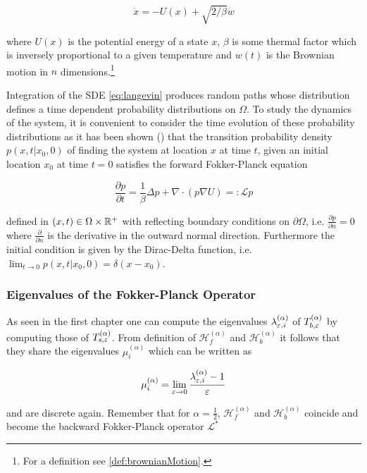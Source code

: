 \begin{equation}\label{eq:langevin}
\dot{x}=-U(x)+\sqrt{2/\beta}\dot{w}
\end{equation}

where $U(x)$ is the potential energy of a state $x$, $\beta$ is some thermal factor which is inversely proportional to a given temperature and $w(t)$ is the Brownian motion in $n$ dimensions.\footnote{For a definition see \ref{def:brownianMotion}.}

Integration of the SDE \eqref{eq:langevin} produces random paths whose distribution defines a time dependent probability distributions on $\Omega$. To study the dynamics of the system, it is convenient to consider the time evolution of these probability distributions as it has been shown (\cite{Garcia2007}) that the transition probability density $p(x, t | x_0, 0)$ of finding the system at location $x$ at time $t$, given an initial location $x_0$ at time $t = 0$ satisfies the forward Fokker-Planck equation

\begin{equation}\label{eq:fokkerplanck}
\frac{\partial p}{\partial t} = \frac{1}{\beta}\Delta p + \nabla\cdot(p\nabla U) =: \mathcal{L}p
\end{equation}

defined in $(x,t)\in \Omega\times\mathbb{R}^+$ with reflecting boundary conditions on $\partial\Omega$, i.e. $\frac{\partial p}{\partial n} = 0$ where $\frac{\partial}{\partial n}$ is the derivative in the outward normal direction. Furthermore the initial condition is given by the Dirac-Delta function, i.e. $\lim_{t\rightarrow 0} p(x, t | x_0, 0) = \delta(x-x_0)$.

\subsubsection{Eigenvalues of the Fokker-Planck Operator}
As seen in the first chapter one can compute the eigenvalues $\lambda_{\varepsilon, i}^{(\alpha)}$ of $T_{b,\varepsilon}^{(\alpha)}$ by computing those of $T_{s,\varepsilon}^{(\alpha)}$. From definition of $\mathcal{H}_f^{(\alpha)}$ and $\mathcal{H}_b^{(\alpha)}$ it follows that they share the eigenvalues $\mu_i^{(\alpha)}$ which can be written as

\begin{equation*}
\mu_i^{(\alpha)} = \lim_{\varepsilon\rightarrow 0}\frac{\lambda_{\varepsilon, i}^{(\alpha)}-1}{\varepsilon} 
\end{equation*}

and are discrete again. Remember that for $\alpha=\frac{1}{2}$, $\mathcal{H}_f^{(\alpha)}$ and $\mathcal{H}_b^{(\alpha)}$ coincide and become the backward Fokker-Planck operator $\mathcal{L}^*$

